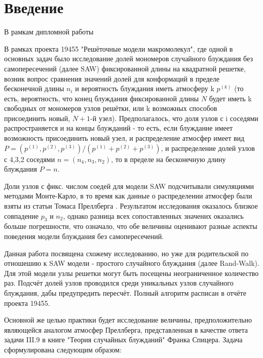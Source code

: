 \section{Введение}

В рамкам дипломной работы  

В рамках проекта 19455 "Решёточные модели макромолекул", где одной в основных задач было исследование долей мономеров случайного блуждания без самопересечений (далее SAW) фиксированной длины на квадратной решетке, возник вопрос сравнения значений долей для конформаций в пределе бесконечной длины $n_i$ и вероятность блуждания иметь атмосферу k $p^{(k)}$ (то есть, вероятность, что конец блуждания фиксированной длины $N$ будет иметь k свободных от мономеров узлов решётки, или k возможных способов присоединить новый, $N+1$-й узел). 
Предполагалось, что доля узлов с i соседями распространяется и на концы блужданий - то есть, если блуждание имеет возможность присоединить новый узел, и распределение атмосфер имеет вид $ P = (p^{(1)},p^{(2)},p^{(3)}) / (p^{(1)}+p^{(2)}+p^{(3)})$, и распределение долей узлов с 4,3,2 соседями $n = (n_4, n_3, n_2)$, то в пределе на бесконечную длину блуждания $P = n$. 

Доли узлов с фикс. числом соедей для модели SAW подсчитывали симуляциями методами Монте-Карло, в то время как данные о распределении атмосфер были взяты из статьи Томаса Преллберга \cite{Spitser1969}.
Результатом исследования оказалось близкое совпадение $p_3$ и $n_2$, однако разница всех сопоставленных значених оказались больше погрешности, что означало, что обе величины оценивают разные аспекты поведения модели блуждания без самопересечений.

Данная работа посвящена схожему исследованию, но уже для родительской по отношешию к SAW модели - простого случайного блуждания (далее Rand-Walk). Для этой модели узлы решетки могут быть посещены неограниченное количество раз. Подсчёт долей узлов проводился среди уникальных узлов случайного блуждания, дабы предупредить пересчёт. Полный алгоритм расписан в отчёте проекта 19455.

Основной же целью практики будет исследование величины, предположительно являющейся аналогом атмосфер Преллберга, представленная в качестве ответа задачи III.9 в книге "Теория случайных блужданий" Франка Спицера. Задача сформулирована следующим образом: 

